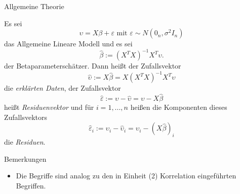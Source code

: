 \documentclass[
  8pt,
  ignorenonframetext,
]{beamer}
\providecommand{\tightlist}{%
  \setlength{\itemsep}{0pt}\setlength{\parskip}{0pt}}
\begin{document}
\begin{frame}{Allgemeine Theorie}
\protect\hypertarget{allgemeine-theorie-4}{}
\footnotesize
\begin{definition}
Es sei 
\begin{equation}
\upsilon = X\beta + \varepsilon \mbox{ mit } \varepsilon \sim N(0_n,\sigma^2I_n) 
\end{equation}
das Allgemeine Lineare Modell und es sei 
\begin{equation}
\hat{\beta} := (X^TX)^{-1}X^T\upsilon. 
\end{equation}
der Betaparameterschätzer. Dann heißt der Zufallsvektor
\begin{equation}
\hat{\upsilon} := X\hat{\beta} = X(X^TX)^{-1}X^T\upsilon
\end{equation}
die \textit{erklärten Daten}, der Zufallsvektor 
\begin{equation}
\hat{\varepsilon} := \upsilon - \hat{\upsilon} = \upsilon - X\hat{\beta}
\end{equation}
heißt \textit{Residuenvektor} und für $i = 1,...,n$ heißen die Komponenten dieses Zufallsvektors  
\begin{equation}
\hat{\varepsilon}_i := \upsilon_i - \hat{\upsilon}_i =  \upsilon_i - (X\hat{\beta})_i 
\end{equation}
die \textit{Residuen}. 
\end{definition}

Bemerkungen

\begin{itemize}
\tightlist
\item
  Die Begriffe sind analog zu den in Einheit (2) Korrelation
  eingeführten Begriffen.
\end{itemize}
\end{frame}
\end{document}
